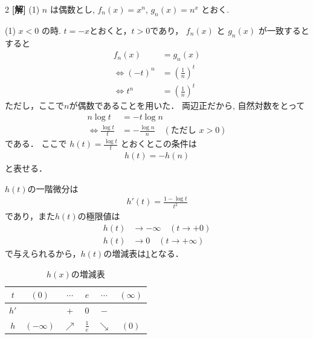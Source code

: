 \documentclass[../../main.tex]{subfiles}
\begin{document}
\setcounter{equation}{0}
\setcounter{figure}{0}
\setcounter{table}{0}
\begin{oframed}
  
\end{oframed}


\setlength{\columnseprule}{0.4pt}
\begin{multicols}{2}
  {\bf[解]}
  (1)
  $n$ は偶数とし, $f_n(x) = x^n$, $g_n(x) = n^x$ とおく.

  (1) $x < 0$ の時. $t=-x$とおくと，$t>0$であり，
  $f_n(x)$ と $g_n(x)$ が一致するとすると
  \begin{align*}
    f_n(x) & = g_n(x)                     \\
    \iff
    (-t)^n & = \left(\frac{1}{n}\right)^t \\
    \iff
    t^n    & = \left(\frac{1}{n}\right)^t
  \end{align*}
  ただし，ここで$n$が偶数であることを用いた．
  両辺正だから, 自然対数をとって
  \begin{align}
    n \log t         & = -t\log n  \nonumber                                             \\
    \iff
    \frac{\log t}{t} & = -\frac{\log n}{n} \quad (\text{ただし } x > 0) \label{2004-2:eq:1}
  \end{align}
  である．
  ここで $h(t) = \frac{\log t}{t}$ とおくとこの条件は
  \begin{align}
    h(t) = - h(n) \label{2004-2:eq:5}
  \end{align}
  と表せる．

  $h(t)$の一階微分は
  \begin{align*}
    h'(t) = \frac{1 - \log t}{t^2}
  \end{align*}
  であり，また$h(t)$の極限値は
  \begin{align*}
    h(t) & \to -\infty \quad (t \to +0) \\
    h(t) & \to 0 \quad (t \to +\infty)
  \end{align*}
  で与えられるから，$h(t)$の増減表は\cref{2004-2:table:1}となる．

  \begin{table}[H]
    \centering
    \caption{$h(x)$の増減表}
    \label{2004-2:table:1}
    \begin{tabular}{|c||c|c|c|c|c|}
      \hline
      $t$  & $(0)$       & $\cdots$   & $e$           & $\cdots$   & $(\infty)$ \\
      \hline
      $h'$ &             & $+$        & $0$           & $-$        &            \\
      \hline
      $h$  & $(-\infty)$ & $\nearrow$ & $\frac{1}{e}$ & $\searrow$ & $(0)$      \\
      \hline
    \end{tabular}
  \end{table}


\end{multicols}
\end{document}
